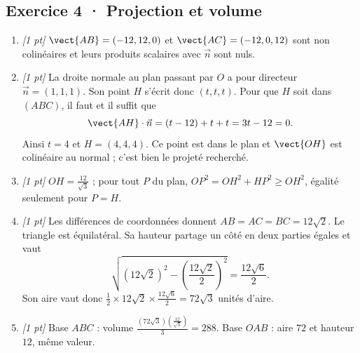 \subsection*{Exercice 4 · Projection et volume}\begin{enumerate}

\item \textit{[1 pt]} $\vect{AB}=(-12,12,0)$ et $\vect{AC}=(-12,0,12)$ sont non colinéaires et leurs produits scalaires avec $\vec n$ sont nuls.

\item \textit{[1 pt]} La droite normale au plan passant par $O$ a pour directeur $\vec n=(1,1,1)$. Son point $H$ s'écrit donc $(t,t,t)$. Pour que $H$ soit dans $(ABC)$, il faut et il suffit que
\[\vect{AH}\cdot\vec n=(t-12)+t+t=3t-12=0.\]
Ainsi $t=4$ et $H=(4,4,4)$. Ce point est dans le plan et $\vect{OH}$ est colinéaire au normal ; c'est bien le projeté recherché.

\item \textit{[1 pt]} $OH=\frac{12}{\sqrt{3}}$ ; pour tout $P$ du plan, $OP^2=OH^2+HP^2\ge OH^2$, égalité seulement pour $P=H$.

\item \textit{[1 pt]} Les différences de coordonnées donnent $AB=AC=BC=12\sqrt2$. Le triangle est équilatéral. Sa hauteur partage un côté en deux parties égales et vaut
\[\sqrt{(12\sqrt2)^2-(\frac{12\sqrt{2}}{2})^2}=\frac{12\sqrt6}{2}.\]
Son aire vaut donc $\frac12\times 12\sqrt2\times\frac{12\sqrt6}{2}=72\sqrt3$ unités d'aire.

\item \textit{[1 pt]} Base $ABC$ : volume $\frac{(72\sqrt3)(\frac{12}{\sqrt{3}})}{3}=288$. Base $OAB$ : aire $72$ et hauteur $12$, même valeur.

\end{enumerate}

\fi

\fi

